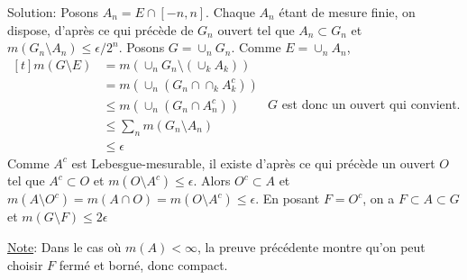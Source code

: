 \documentclass{report}
\begin{document}
Solution: Posons $A_n = E\cap [-n,n]$. Chaque $A_n$ étant de mesure finie, on dispose, d'après ce qui précède de $G_n$ ouvert tel que $A_n\subset G_n$ et $m(G_n\setminus A_n)\leq \epsilon/2^n$. Posons $G=\cup_n G_n$. Comme $E=\cup_n A_n$, $\begin{aligned}[t] m(G\setminus E) &= m(\cup_n G_n \setminus \left(\cup_k A_k \right)) \\ 
&= m(\cup_n \left( G_n \cap \cap_k A_k^c \right)) \\ &\leq m(\cup_n \left( G_n \cap A_n^c \right)) \\ &\leq \sum_n m(G_n \setminus A_n)\\ &\leq \epsilon \end{aligned}$ \newline
$G$ est donc un ouvert qui convient.
 \newline \newline
Comme $A^c$ est Lebesgue-mesurable, il existe d'après ce qui précède un ouvert $O$ tel que $A^c\subset O$ et $m(O\setminus A^c)\leq \epsilon $. Alors $O^c \subset A$ et $m(A\setminus O^c) = m(A\cap O)  = m(O \setminus A^c) \leq \epsilon $. \newline
En posant $F = O^c$, on a $F\subset A \subset G$ et $m(G\setminus F)\leq 2\epsilon$ \newline \newline

\underline{Note}: Dans le cas où $m(A)<\infty$, la preuve précédente montre qu'on peut choisir $F$ fermé et borné, donc compact.


\newpage
 \subsection{}  \\ \\
\end{document}
